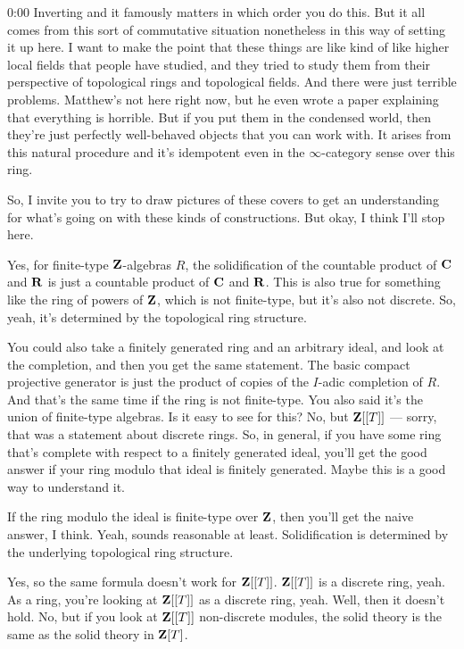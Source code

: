 \begin{unfinished}{0:00}
Inverting and it famously matters in which order you do this. But it all comes from this sort of commutative situation nonetheless in this way of setting it up here. I want to make the point that these things are like kind of like higher local fields that people have studied, and they tried to study them from their perspective of topological rings and topological fields. And there were just terrible problems. Matthew's not here right now, but he even wrote a paper explaining that everything is horrible. But if you put them in the condensed world, then they're just perfectly well-behaved objects that you can work with. It arises from this natural procedure and it's idempotent even in the $\infty$-category sense over this ring.

So, I invite you to try to draw pictures of these covers to get an understanding for what's going on with these kinds of constructions. But okay, I think I'll stop here.

Yes, for finite-type $\mathbf Z$-algebras $R$, the solidification of the countable product of $\mathbf C$ and $\mathbf R$ is just a countable product of $\mathbf C$ and $\mathbf R$. This is also true for something like the ring of powers of $\mathbf Z$, which is not finite-type, but it's also not discrete. So, yeah, it's determined by the topological ring structure.

You could also take a finitely generated ring and an arbitrary ideal, and look at the completion, and then you get the same statement. The basic compact projective generator is just the product of copies of the $I$-adic completion of $R$. And that's the same time if the ring is not finite-type. You also said it's the union of finite-type algebras. Is it easy to see for this? No, but $\mathbf Z[[T]]$ — sorry, that was a statement about discrete rings. So, in general, if you have some ring that's complete with respect to a finitely generated ideal, you'll get the good answer if your ring modulo that ideal is finitely generated. Maybe this is a good way to understand it.

If the ring modulo the ideal is finite-type over $\mathbf Z$, then you'll get the naive answer, I think. Yeah, sounds reasonable at least. Solidification is determined by the underlying topological ring structure.

Yes, so the same formula doesn't work for $\mathbf Z[[T]]$. $\mathbf Z[[T]]$ is a discrete ring, yeah. As a ring, you're looking at $\mathbf Z[[T]]$ as a discrete ring, yeah. Well, then it doesn't hold. No, but if you look at $\mathbf Z[[T]]$ non-discrete modules, the solid theory is the same as the solid theory in $\mathbf Z[T]$.


\end{unfinished}
